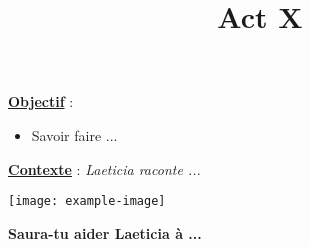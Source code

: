 \documentclass[10pt]{article}
\newcommand{\titreActivite}{Act X} %
\newcommand{\objectif}{ 	
	
	\begin{itemize}
		\item Savoir faire ...
	\end{itemize}
} %
\newcommand{\contexte}{
	Laeticia raconte ...
}
\newcommand{\resumeContexte}{
	Saura-tu aider Laeticia à ...
	} %
\begin{document}
\date{}
\title{\titreActivite}
\maketitle %


\underline{\textbf{Objectif}} :  \vspace{2pt}
\objectif

\vspace{4pt}

\underline{\textbf{Contexte}} :  \textit{\contexte}

\begin{center}
	\texttt{[image: example-image]} %
\end{center}

\textbf{\resumeContexte}
\vspace{-12pt}



\begin{question}
	\end{question}
\end{document}
